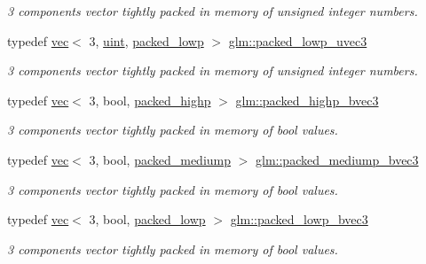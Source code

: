 \begin{DoxyCompactItemize}
\begin{DoxyCompactList}\small\item\em 3 components vector tightly packed in memory of unsigned integer numbers. \end{DoxyCompactList}\item 
typedef \hyperlink{structglm_1_1vec}{vec}$<$ 3, \hyperlink{group__core__precision_ga4fd29415871152bfb5abd588334147c8}{uint}, \hyperlink{namespaceglm_a36ed105b07c7746804d7fdc7cc90ff25ac36a4bd74559be2c0b65bc48e5953b8b}{packed\+\_\+lowp} $>$ \hyperlink{group__gtc__type__aligned_ga895469f176463355d8b0a4bd8a4eaf45}{glm\+::packed\+\_\+lowp\+\_\+uvec3}
\begin{DoxyCompactList}\small\item\em 3 components vector tightly packed in memory of unsigned integer numbers. \end{DoxyCompactList}\item 
typedef \hyperlink{structglm_1_1vec}{vec}$<$ 3, bool, \hyperlink{namespaceglm_a36ed105b07c7746804d7fdc7cc90ff25a8e8791ee77fe079b1291f710d88031bf}{packed\+\_\+highp} $>$ \hyperlink{group__gtc__type__aligned_gafad47eaff82deab03a1e8d82d2dbd046}{glm\+::packed\+\_\+highp\+\_\+bvec3}
\begin{DoxyCompactList}\small\item\em 3 components vector tightly packed in memory of bool values. \end{DoxyCompactList}\item 
typedef \hyperlink{structglm_1_1vec}{vec}$<$ 3, bool, \hyperlink{namespaceglm_a36ed105b07c7746804d7fdc7cc90ff25a9604654c3b137cd7898689fd34b25bc0}{packed\+\_\+mediump} $>$ \hyperlink{group__gtc__type__aligned_ga5680ac66be8ba6f8bc6725553d4e8723}{glm\+::packed\+\_\+mediump\+\_\+bvec3}
\begin{DoxyCompactList}\small\item\em 3 components vector tightly packed in memory of bool values. \end{DoxyCompactList}\item 
typedef \hyperlink{structglm_1_1vec}{vec}$<$ 3, bool, \hyperlink{namespaceglm_a36ed105b07c7746804d7fdc7cc90ff25ac36a4bd74559be2c0b65bc48e5953b8b}{packed\+\_\+lowp} $>$ \hyperlink{group__gtc__type__aligned_gae995413af4c773ede88dfa5b13a82fab}{glm\+::packed\+\_\+lowp\+\_\+bvec3}
\begin{DoxyCompactList}\small\item\em 3 components vector tightly packed in memory of bool values. \end{DoxyCompactList}\item 

\end{DoxyCompactItemize}

